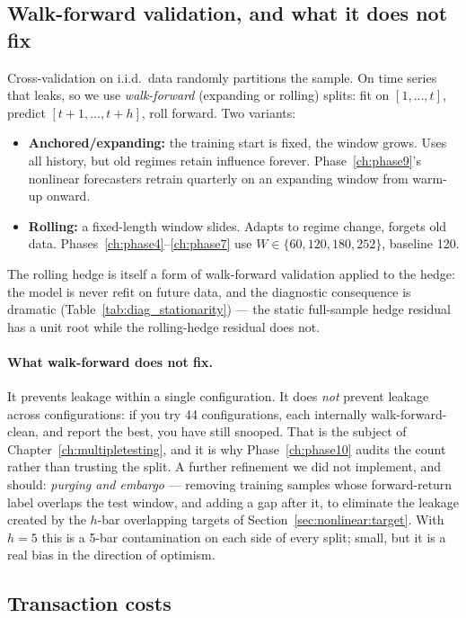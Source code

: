 \subsection{Walk-forward validation, and what it does not fix}
\label{sec:bt:walkforward}

Cross-validation on i.i.d.\ data randomly partitions the sample. On time series that
leaks, so we use \emph{walk-forward} (expanding or rolling) splits: fit on
$[1,\dots,t]$, predict $[t+1,\dots,t+h]$, roll forward. Two variants:
\begin{itemize}
  \item \textbf{Anchored/expanding:} the training start is fixed, the window grows. Uses
    all history, but old regimes retain influence forever. Phase~\ref{ch:phase9}'s
    nonlinear forecasters retrain quarterly on an expanding window from warm-up onward.
  \item \textbf{Rolling:} a fixed-length window slides. Adapts to regime change, forgets
    old data. Phases~\ref{ch:phase4}--\ref{ch:phase7} use $W\in\{60,120,180,252\}$,
    baseline 120.
\end{itemize}
The rolling hedge is itself a form of walk-forward validation applied to the hedge: the
model is never refit on future data, and the diagnostic consequence is dramatic
(Table~\ref{tab:diag_stationarity}) --- the static full-sample hedge residual has a unit
root while the rolling-hedge residual does not.

\paragraph{What walk-forward does not fix.} It prevents leakage within a single
configuration. It does \emph{not} prevent leakage across configurations: if you try 44
configurations, each internally walk-forward-clean, and report the best, you have still
snooped. That is the subject of Chapter~\ref{ch:multipletesting}, and it is why
Phase~\ref{ch:phase10} audits the count rather than trusting the split. A further
refinement we did not implement, and should: \emph{purging and embargo}
\cite{lopezdeprado2018advances} --- removing training samples whose forward-return label
overlaps the test window, and adding a gap after it, to eliminate the leakage created by
the $h$-bar overlapping targets of Section~\ref{sec:nonlinear:target}. With $h=5$ this is
a 5-bar contamination on each side of every split; small, but it is a real bias in the
direction of optimism.

\subsection{Transaction costs}
\label{sec:bt:cost}

